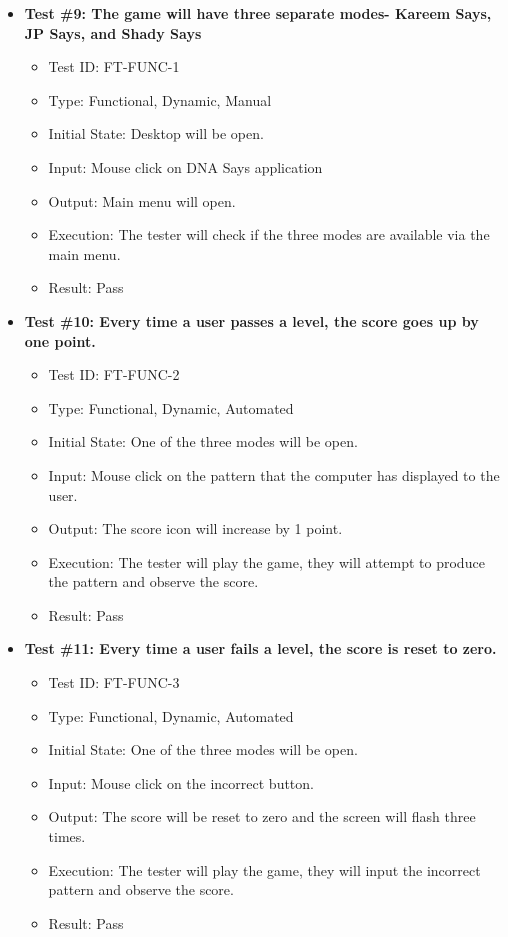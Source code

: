 \documentclass[12pt, titlepage]{article}
\begin{document}
\begin{itemize}

\item \textbf{Test \#9: The game will have three separate modes- Kareem Says, JP Says, and Shady Says }
\begin{itemize}
\item Test ID: FT-FUNC-1
\item Type: Functional, Dynamic, Manual 		
\item Initial State: Desktop will be open.					
\item Input: Mouse click on DNA Says application	
\item Output: Main menu will open.					
\item Execution: The tester will check if the three modes are available via the main menu.
\item Result: Pass
\end{itemize}

\item \textbf{Test \#10: Every time a user passes a level, the score goes up by one point.}
\begin{itemize}
\item Test ID: FT-FUNC-2
\item Type: Functional, Dynamic, Automated		
\item Initial State: One of the three modes will be open.					
\item Input: Mouse click on the pattern that the computer has displayed to the user.					
\item Output: The score icon will increase by 1 point. 					
\item Execution: The tester will play the game, they will attempt to produce the pattern and observe the score.
\item Result: Pass
\end{itemize}

\item \textbf{Test \#11: Every time a user fails a level, the score is reset to zero.}
\begin{itemize}
\item Test ID: FT-FUNC-3
\item Type: Functional, Dynamic, Automated	
\item Initial State: One of the three modes will be open.					
\item Input: Mouse click on the incorrect button.					
\item Output: The score will be reset to zero and the screen will flash three times. 					
\item Execution: The tester will play the game, they will input the incorrect pattern and observe the score.
\item Result: Pass
\end{itemize}


\end{itemize}
\end{document}

